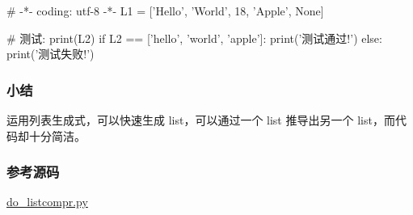 \begin{pythoncode}
# -*- coding: utf-8 -*-
L1 = ['Hello', 'World', 18, 'Apple', None]
\end{pythoncode}

\begin{pythoncode}
# 测试:
print(L2)
if L2 == ['hello', 'world', 'apple']:
    print('测试通过!')
else:
    print('测试失败!')
\end{pythoncode}

\hypertarget{ux5c0fux7ed3}{%
\subsubsection{小结}\label{ux5c0fux7ed3}}

运用列表生成式，可以快速生成 list，可以通过一个 list 推导出另一个
list，而代码却十分简洁。

\hypertarget{ux53c2ux8003ux6e90ux7801}{%
\subsubsection{参考源码}\label{ux53c2ux8003ux6e90ux7801}}

\href{https://github.com/michaelliao/learn-python3/blob/master/samples/advance/do_listcompr.py}{do\_listcompr.py}

